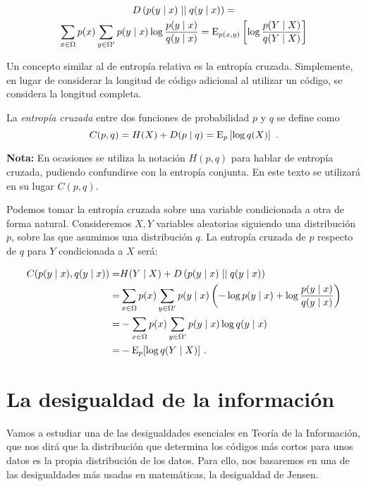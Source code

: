 \begin{gather*}D\left(p(y\mid x)\mid\mid q(y\mid x)\right)=\\\sum_{x\in\Omega}p(x)\sum_{y\in\Omega'}p(y\mid x)\log\frac{p(y\mid x)}{q(y\mid x)}=\mathrm{E}_{p(x,y)}\left[\log\frac{p(Y\mid X)}{q(Y\mid X)}\right]
\end{gather*}


Un concepto similar al de entropía relativa es la entropía cruzada.
Simplemente, en lugar de considerar la longitud de código adicional al
utilizar un código, se considera la longitud completa.

La \emph{entropía cruzada} entre dos funciones de probabilidad \(p\) y
\(q\) se define como
\[C(p, q)=H(X) + D(p\mid q)=\mathrm{E}_p\left[\log q(X)\right]~.\]

\textbf{Nota:} En ocasiones se utiliza la notación \(H(p,q)\) para
hablar de entropía cruzada, pudiendo confundirse con la entropía
conjunta. En este texto se utilizará en su lugar \(C(p,q)\). 

\remb
Podemos tomar la entropía cruzada sobre una variable condicionada a otra
de forma natural. Consideremos \(X,Y\) variables aleatorias siguiendo
una distribución \(p\), sobre las que asumimos una distribución \(q\).
La entropía cruzada de \(p\) respecto de \(q\) para \(Y\) condicionada a
\(X\) será:

\begin{align*}
  C(p(y\mid x),q(y \mid x))=&H(Y\mid X) + D\left(p(y\mid x)\mid\mid q(y\mid x)\right)\\
                =&\sum_{x\in\Omega}p(x)\sum_{y\in\Omega'}p(y\mid x)\left(-\log p(y\mid x)
                  +\log\frac{p(y\mid x)}{q(y\mid x)}\right)\\
                =&-\sum_{x\in\Omega}p(x)\sum_{y\in\Omega'}p(y\mid x)\log q(y\mid x)\\
                =&-\mathrm{E}_p[\log q(Y\mid X)]~.
\end{align*}

\reme

\section{La desigualdad de la
información}\label{la-desigualdad-de-la-informaciuxf3n}

Vamos a estudiar una de las desigualdades esenciales en Teoría de la
Información, que nos dirá que la distribución que determina los códigos
más cortos para unos datos es la propia distribución de los datos. Para
ello, nos basaremos en una de las desigualdades más usadas en
matemáticas, la desigualdad de Jensen.

